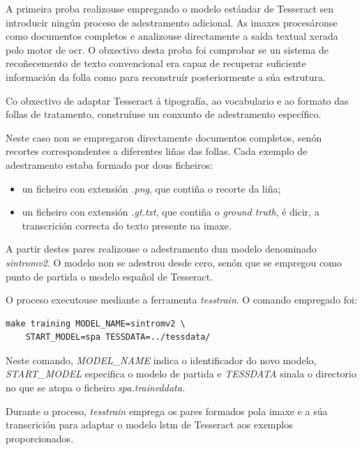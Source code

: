 A primeira proba realizouse empregando o modelo estándar de Tesseract sen introducir ningún proceso de adestramento adicional. As imaxes procesáronse como documentos completos e analizouse directamente a saída textual xerada polo motor de \gls{ocr}. O obxectivo desta proba foi comprobar se un sistema de recoñecemento de texto convencional era capaz de recuperar suficiente información da folla como para reconstruír posteriormente a súa estrutura.

Co obxectivo de adaptar Tesseract á tipografía, ao vocabulario e ao formato das follas de tratamento, construíuse un conxunto de adestramento específico.

Neste caso non se empregaron directamente documentos completos, senón recortes correspondentes a diferentes liñas das follas. Cada exemplo de adestramento estaba formado por dous ficheiros:

\begin{itemize}
    \item un ficheiro con extensión \textit{.png}, que contiña o recorte da liña;
    \item un ficheiro con extensión \textit{.gt.txt}, que contiña o \textit{ground truth}, é dicir, a transcrición correcta do texto presente na imaxe.
\end{itemize}

A partir destes pares realizouse o adestramento dun modelo denominado \textit{sintromv2}. O modelo non se adestrou desde cero, senón que se empregou como punto de partida o modelo español de Tesseract.

O proceso executouse mediante a ferramenta \textit{tesstrain}. O comando empregado foi:

\begin{verbatim}
make training MODEL_NAME=sintromv2 \
    START_MODEL=spa TESSDATA=../tessdata/
\end{verbatim}

Neste comando, \textit{MODEL\_NAME} indica o identificador do novo modelo, \textit{START\_MODEL} especifica o modelo de partida e \textit{TESSDATA} sinala o directorio no que se atopa o ficheiro \textit{spa.traineddata}.

Durante o proceso, \textit{tesstrain} emprega os pares formados pola imaxe e a súa transcrición para adaptar o modelo \gls{lstm} de Tesseract aos exemplos proporcionados.


